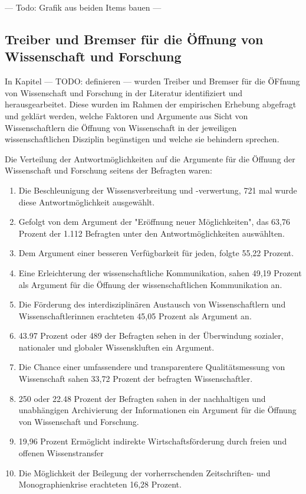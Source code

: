 --- Todo: Grafik aus beiden Items bauen ---

\subsection{Treiber und Bremser für die Öffnung von Wissenschaft und Forschung}

In Kapitel --- TODO: definieren --- wurden Treiber und Bremser für die ÖFfnung von Wissenschaft und Forschung in der Literatur identifiziert und herausgearbeitet. Diese wurden im Rahmen der empirischen Erhebung abgefragt und geklärt werden, welche Faktoren und Argumente aus Sicht von Wissenschaftlern die Öffnung von Wissenschaft in der jeweiligen wissenschaftlichen Disziplin begünstigen und welche sie behindern sprechen.

Die Verteilung der Antwortmöglichkeiten auf die Argumente für die Öffnung der Wissenschaft und Forschung seitens der Befragten waren:
\begin{enumerate}
\item Die Beschleunigung der Wissensverbreitung und -verwertung, 721 mal wurde diese Antwortmöglichkeit ausgewählt.
\item Gefolgt von dem Argument der "Eröffnung neuer Möglichkeiten", das 63,76 Prozent der 1.112 Befragten unter den Antwortmöglichkeiten auswählten.
\item Dem Argument einer besseren Verfügbarkeit für jeden, folgte 55,22 Prozent.
\item Eine Erleichterung der wissenschaftliche Kommunikation, sahen 49,19 Prozent als Argument für die Öffnung der wissenschaftlichen Kommunikation an.
\item Die Förderung des interdisziplinären Austausch von Wissenschaftlern und Wissenschaftlerinnen erachteten 45,05 Prozent als Argument an.
\item 43.97 Prozent oder 489 der Befragten sehen in der Überwindung sozialer, nationaler und globaler Wissenskluften ein Argument.
\item Die Chance einer umfassendere und transparentere Qualitätsmessung von Wissenschaft sahen 33,72 Prozent der befragten Wissenschaftler.
\item 250 oder 22.48 Prozent der Befragten sahen in der nachhaltigen und unabhängigen Archivierung der Informationen ein Argument für die Öffnung von Wissenschaft und Forschung.
\item 19,96 Prozent Ermöglicht indirekte Wirtschaftsförderung durch freien und offenen Wissenstransfer
\item Die Möglichkeit der Beilegung der vorherrschenden Zeitschriften- und Monographienkrise erachteten 16,28 Prozent.
\end{enumerate}

